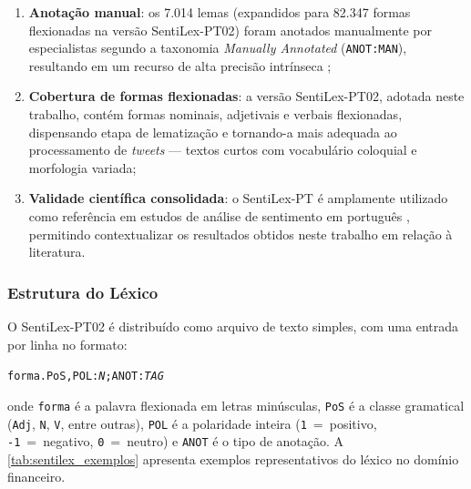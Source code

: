 \begin{enumerate}
	\item \textbf{Anotação manual}: os 7.014 lemas (expandidos para 82.347 formas flexionadas na versão SentiLex-PT02) foram anotados manualmente por especialistas segundo a taxonomia \textit{Manually Annotated} (\texttt{ANOT:MAN}), resultando em um recurso de alta precisão intrínseca \cite{carvalho2015sentilex};

	\item \textbf{Cobertura de formas flexionadas}: a versão SentiLex-PT02, adotada neste trabalho, contém formas nominais, adjetivais e verbais flexionadas, dispensando etapa de lematização e tornando-a mais adequada ao processamento de \textit{tweets} --- textos curtos com vocabulário coloquial e morfologia variada;

	\item \textbf{Validade científica consolidada}: o SentiLex-PT é amplamente utilizado como referência em estudos de análise de sentimento em português \cite{liu2020survey}, permitindo contextualizar os resultados obtidos neste trabalho em relação à literatura.
\end{enumerate}

\subsubsection{Estrutura do Léxico}
\label{subsubsec:estrutura_sentilex}

O SentiLex-PT02 é distribuído como arquivo de texto simples, com uma entrada por linha no formato:

\begin{center}
	\texttt{forma.PoS,POL:\textit{N};ANOT:\textit{TAG}}
\end{center}

\noindent onde \texttt{forma} é a palavra flexionada em letras minúsculas, \texttt{PoS} é a classe gramatical (\texttt{Adj}, \texttt{N}, \texttt{V}, entre outras), \texttt{POL} é a polaridade inteira (\texttt{1}~=~positivo, \texttt{-1}~=~negativo, \texttt{0}~=~neutro) e \texttt{ANOT} é o tipo de anotação. A \autoref{tab:sentilex_exemplos} apresenta exemplos representativos do léxico no domínio financeiro.

